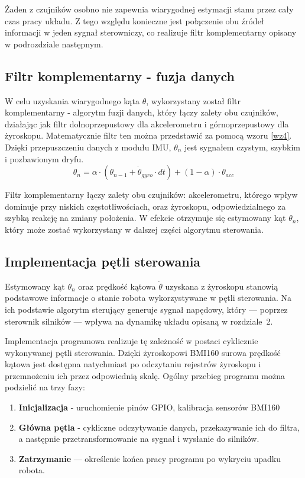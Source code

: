 \documentclass[12pt,twoside]{article}
\begin{document}
Żaden z czujników osobno nie zapewnia wiarygodnej estymacji stanu przez cały czas pracy układu. Z tego względu konieczne jest połączenie obu źródeł informacji w jeden sygnał sterowniczy, co realizuje filtr komplementarny opisany w podrozdziale następnym.

\subsection{Filtr komplementarny - fuzja danych}
W celu uzyskania wiarygodnego kąta $\theta$, wykorzystany został filtr komplementarny - algorytm fuzji danych, który łączy zalety obu czujników, działając jak filtr dolnoprzepustowy dla akcelerometru i górnoprzepustowy dla żyroskopu. Matematycznie filtr ten można przedstawić za pomocą wzoru \ref{wz4}. Dzięki przepuszczeniu danych z modułu IMU, $\theta_n$ jest sygnałem czystym, szybkim i pozbawionym dryfu.
\begin{equation}
\theta_{n} = \alpha \cdot (\theta_{n-1} + \dot{\theta}_{gyro} \cdot dt) + (1 - \alpha) \cdot \theta_{acc}
\label{wz4}
\end{equation}

Filtr komplementarny łączy zalety obu czujników: akcelerometru, którego wpływ dominuje przy niskich częstotliwościach, oraz żyroskopu, odpowiedzialnego za szybką reakcję na zmiany położenia. W efekcie otrzymuje się estymowany kąt $\theta_n$, który może zostać wykorzystany w dalszej części algorytmu sterowania.

\subsection{Implementacja pętli sterowania}

Estymowany kąt $\theta_n$ oraz prędkość kątowa $\dot{\theta}$ uzyskana z żyroskopu stanowią podstawowe informacje o stanie robota wykorzystywane w pętli sterowania. Na ich podstawie algorytm sterujący generuje sygnał napędowy, który --- poprzez sterownik silników --- wpływa na dynamikę układu opisaną w rozdziale~2.

Implementacja programowa realizuje tę zależność w postaci cyklicznie wykonywanej pętli sterowania. Dzięki żyroskopowi BMI160 surowa prędkość kątowa jest dostępna natychmiast po odczytaniu rejestrów żyroskopu i przemnożeniu ich przez odpowiednią skalę. Ogólny przebieg programu można podzielić na trzy fazy:
\begin{enumerate}
    \item \textbf{Inicjalizacja} - uruchomienie pinów GPIO, kalibracja sensorów BMI160
    \item \textbf{Główna pętla} - cykliczne odczytywanie danych, przekazywanie ich do filtra, a następnie przetransformowanie na sygnał i wysłanie do silników.
    \item \textbf{Zatrzymanie} --- określenie końca pracy programu po wykryciu upadku robota.
\end{enumerate}
\end{document}
